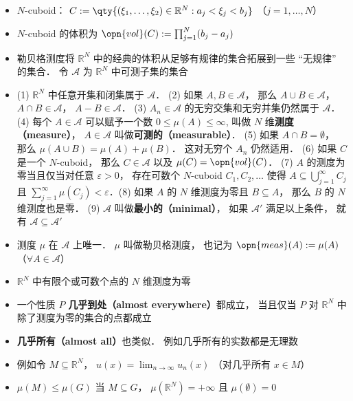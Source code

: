 \begin{itemize}
\item $N$-cuboid： $C := \qty{(\xi_1, \dots, \xi_2) \in \mathbb R^N: a_j < \xi_j < b_j}$ （$j = 1, \dots, N$）

\item $N$-cuboid 的体积为 $\opn{vol}(C) := \prod_{j=1}^N(b_j - a_j)$

\item 勒贝格测度将 $\mathbb R^N$ 中的经典的体积从足够有规律的集合拓展到一些 “无规律” 的集合． 令 $\mathcal A$ 为 $\mathbb R^N$ 中可测子集的集合

\item (1) $\mathbb R^N$ 中任意开集和闭集属于 $\mathcal A$． (2) 如果 $A, B \in \mathcal A$， 那么 $A\cup B \in \mathcal A$， $A\cap B \in \mathcal A$， $A - B \in \mathcal A$． (3) $A_n \in \mathcal A$ 的无穷交集和无穷并集仍然属于 $\mathcal A$． (4) 每个 $A \in\mathcal A$ 可以赋予一个数 $0 \le \mu(A) \le \infty$, 叫做 $N$ 维\textbf{测度（measure）}， $A\in\mathcal A$ 叫做\textbf{可测的（measurable）}． (5) 如果 $A\cap B = \emptyset$， 那么 $\mu(A\cup B) = \mu(A) + \mu(B)$． 这对无穷个 $A_n$ 仍然适用． (6) 如果 $C$ 是一个 $N$-cuboid， 那么 $C\in\mathcal A$ 以及 $\mu(C) = \opn{vol}(C)$． (7) $A$ 的测度为零当且仅当对任意 $\varepsilon>0$， 存在可数个 $N$-cuboid $C_1, C_2, \dots$ 使得 $A \subseteq \bigcup_{j=1}^\infty C_j$ 且 $\sum_{j=1}^\infty \mu(C_j) < \varepsilon$．(8) 如果 $A$ 的 $N$ 维测度为零且 $B\subseteq A$， 那么 $B$ 的 $N$ 维测度也是零． (9) $\mathcal A$ 叫做\textbf{最小的（minimal）}， 如果 $\mathcal A'$ 满足以上条件， 就有 $\mathcal A \subseteq \mathcal A'$

\item 测度 $\mu$ 在 $\mathcal A$ 上唯一． $\mu$ 叫做勒贝格测度， 也记为 $\opn{meas}(A) := \mu(A)$ （$\forall A\in\mathcal A$）

\item $\mathbb R^N$ 中有限个或可数个点的 $N$ 维测度为零

\item 一个性质 $P$ \textbf{几乎到处（almost everywhere）}都成立， 当且仅当 $P$ 对 $\mathbb R^N$ 中除了测度为零的集合的点都成立

\item \textbf{几乎所有（almost all）}也类似． 例如几乎所有的实数都是无理数

\item 例如令 $M\subseteq\mathbb R^N$， $u(x) = \lim_{n\to\infty} u_n(x)$ （对几乎所有 $x\in M$）

\item $\mu(M)\le\mu(G)$ 当 $M\subseteq G$， $\mu(\mathbb R^N) = +\infty$ 且 $\mu(\emptyset) = 0$
\end{itemize}

